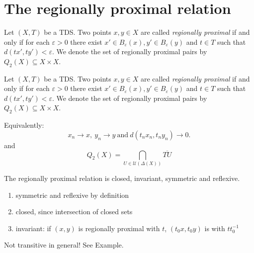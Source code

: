 \section{The regionally proximal relation}

\begin{frame}
  \begin{definition}
    \label{def:rpr}
    Let $(X, T)$ be a TDS.
    Two points $x,y \in X$ are called \emph{regionally proximal}
    if and only if for each $\varepsilon > 0$ there exist $x' \in B_\varepsilon(x), y' \in B_\varepsilon(y)$
    and $t \in T$ such that $d(tx', ty') < \varepsilon$.
    We denote the set of regionally proximal pairs by $Q_2(X) \subseteq X \times X$.
  \end{definition}

  \begin{center}
    
  \end{center}
    
\end{frame}

\begin{frame}

  \begin{definition}
    \label{def:rpr}
    Let $(X, T)$ be a TDS.
    Two points $x,y \in X$ are called \emph{regionally proximal}
    if and only if for each $\varepsilon > 0$ there exist $x' \in B_\varepsilon(x), y' \in B_\varepsilon(y)$
    and $t \in T$ such that $d(tx', ty') < \varepsilon$.
    We denote the set of regionally proximal pairs by $Q_2(X) \subseteq X \times X$.
  \end{definition}
  Equivalently:
  \begin{equation}
      \label{eq:rprchar}
      x_n \to x, \ y_n \to y \ \text{and} \ d(t_n x_n, t_n y_n) \to 0.
  \end{equation} 
  and
  \begin{equation*}
    Q_2(X) = \bigcap_{U \in \mathcal{U}(\Delta(X))} \overline{TU} 
  \end{equation*}
\end{frame}

\begin{frame}
\begin{theorem}
  The regionally proximal relation is closed, invariant, symmetric and reflexive.
\end{theorem}

\begin{enumerate}
  \item symmetric and reflexive by definition
  \item closed, since intersection of closed sets
  \item invariant: if $(x, y)$ is regionally proximal with $t$,
  $(t_0x, t_0y)$ is with $t t_0^{-1}$ 
\end{enumerate}

Not transitive in general! See Example.
\end{frame}

